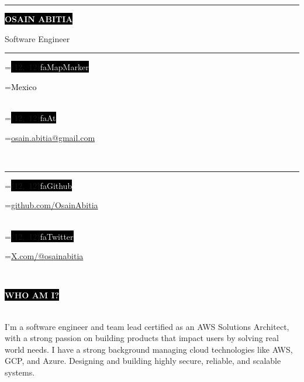 \documentclass[10pt,A4]{article}
\newcommand*{\vcenteredhbox}[1]{\begingroup
	\setbox0=\hbox{#1}\parbox{\wd0}{\box0}\endgroup}
\newcommand{\icon}[2]{\colorbox{black}{\makebox(#2, #2){\textcolor{white}{\large\csname fa#1\endcsname}}}}	%
\newcommand{\icontext}[3]{ 						%
	\vcenteredhbox{\icon{#1}{#2}}\hspace{0.2cm}\vcenteredhbox{\textcolor{black}{#3}}
}
\newcounter{a}
\newcounter{b}
\newcounter{c}
\newcommand{\cvsection}[1] {
	\textcolor{white}{\MakeUppercase{\textbf{#1}}}
}
\newcommand{\cvsect}[1]{
	\colorbox{black}{{\cvsection{#1}}}\\\\%
}
\begin{document}
	
	\begin{minipage}[t]{0.45\textwidth}\hrule height 0pt width 0pt%
		\colorbox{black}{{\HUGE\textcolor{white}{\textbf{\MakeUppercase{Osain Abitia}}}}}%
		
		\vspace{1mm}\LARGE{Software Engineer}
	\end{minipage}%
	\begin{minipage}[t]{0.3\textwidth}\hrule height 0pt width 0pt%
		\small%
		\icontext{MapMarker}{12}{Mexico}\\
		\icontext{At}{12}{\href{mailto:osain.abitia@gmail.com}{osain.abitia@gmail.com}}\\	
	\end{minipage}%
	\begin{minipage}[t]{0.3\textwidth}\hrule height 0pt width 0pt%
		\small%
		\icontext{Github}{12}{\href{https://github.com/OsainAbitia}{github.com/OsainAbitia}}\\
		\icontext{Twitter}{12}{\href{https://twitter.com/@osainabitia}{X.com/@osainabitia}}\\
	\end{minipage}%
	
	\small%
	\vspace{1cm}
	
	
	\cvsect{Who Am I?}%
	\begin{minipage}[t]{1\textwidth}%
		I'm a software engineer and team lead certified as an AWS Solutions Architect, with a 
		strong passion on building products that impact users by solving real world needs.
		I have a strong background managing cloud technologies like AWS, GCP, and Azure. Designing
		and building highly secure, reliable, and scalable systems.
	\end{minipage}%
	\hfill
	\vspace{1cm}
	
	
\end{document}
